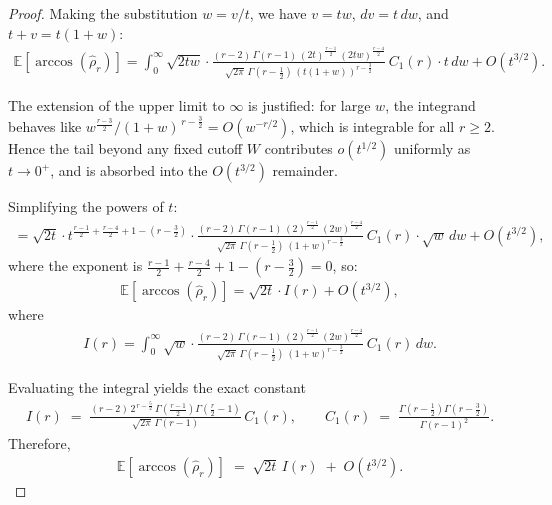 \begin{proof}
Making the substitution \( w = v/t \), we have \( v = tw \), \( dv = t\,dw \), and \( t+v = t(1+w) \):
\begin{align}
\mathbb{E}[\arccos(\hat{\rho}_r)] = \int_{0}^{\infty} \sqrt{2tw} \cdot \frac{(r-2)\,\Gamma(r-1)\,(2t)^{\frac{r-1}{2}}\,(2tw)^{\frac{r-4}{2}}}{\sqrt{2\pi}\,\Gamma(r-\tfrac{1}{2})\,(t(1+w))^{r-\frac{3}{2}}}\,C_1(r) \cdot t \, dw + O(t^{3/2}).
\end{align}

The extension of the upper limit to \( \infty \) is justified: for large \( w \),
the integrand behaves like \( w^{\frac{r-3}{2}}/(1+w)^{\,r-\frac{3}{2}} = O(w^{-r/2}) \),
which is integrable for all \( r\ge 2 \). Hence the tail beyond any fixed cutoff \( W \) contributes \( o(t^{1/2}) \) uniformly as \( t\to 0^+ \),
and is absorbed into the \( O(t^{3/2}) \) remainder.

Simplifying the powers of \( t \):
\begin{align}
= \sqrt{2t} \cdot t^{\frac{r-1}{2} + \frac{r-4}{2} + 1 - (r-\frac{3}{2})} \cdot \frac{(r-2)\,\Gamma(r-1)\,(2)^{\frac{r-1}{2}}\,(2w)^{\frac{r-4}{2}}}{\sqrt{2\pi}\,\Gamma(r-\tfrac{1}{2})\,(1+w)^{r-\frac{3}{2}}}\,C_1(r) \cdot \sqrt{w} \, dw + O(t^{3/2}),
\end{align}
where the exponent is \( \frac{r-1}{2} + \frac{r-4}{2} + 1 - (r-\frac{3}{2}) = 0 \), so:
\begin{align}
\mathbb{E}[\arccos(\hat{\rho}_r)] = \sqrt{2t} \cdot I(r) + O(t^{3/2}),
\end{align}
where
\begin{align}
I(r) = \int_{0}^{\infty} \sqrt{w} \cdot \frac{(r-2)\,\Gamma(r-1)\,(2)^{\frac{r-1}{2}}\,(2w)^{\frac{r-4}{2}}}{\sqrt{2\pi}\,\Gamma(r-\tfrac{1}{2})\,(1+w)^{r-\frac{3}{2}}}\,C_1(r) \, dw.
\end{align}

Evaluating the integral yields the exact constant
\begin{align}
I(r) \;=\; \frac{(r-2)\,2^{\,r-\frac{5}{2}}\,\Gamma\!\left(\frac{r-1}{2}\right)\Gamma\!\left(\frac{r}{2}-1\right)}{\sqrt{2\pi}\,\Gamma(r-1)}\,C_1(r),
\qquad
C_1(r) \;=\; \frac{\Gamma\!\left(r-\tfrac{1}{2}\right)\Gamma\!\left(r-\tfrac{3}{2}\right)}{\Gamma(r-1)^2}.
\end{align}
Therefore,
\begin{align}
\mathbb{E}[\arccos(\hat{\rho}_r)] \;=\; \sqrt{2t}\,I(r) \;+\; O(t^{3/2}).
\end{align}


\end{proof}
